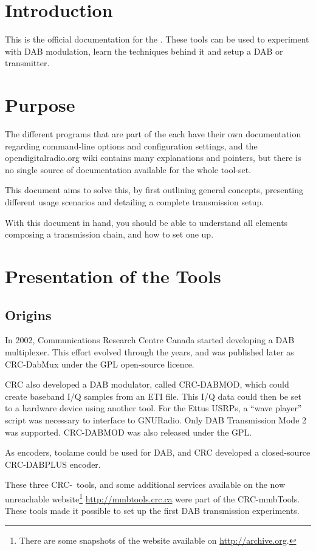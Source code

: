 \section{Introduction}
This is the official documentation for the \mmbtools. These tools can be used to
experiment with DAB modulation, learn the techniques behind it and setup a DAB
or \dabplus transmitter.

\section{Purpose}
The different programs that are part of the \mmbtools each have their own
documentation regarding command-line options and configuration settings, and the
opendigitalradio.org wiki
contains many explanations and pointers, but there is
no single source of documentation available for the whole tool-set.

This document aims to solve this, by first outlining general concepts,
presenting different usage scenarios and detailing a complete transmission
setup.

With this document in hand, you should be able to understand all elements
composing a \mmbtools transmission chain, and how to set one up.

\section{Presentation of the Tools}
\subsection{Origins}
In 2002, Communications Research Centre Canada
started developing a DAB multiplexer. This effort evolved through the years, and
was published later as \mbox{CRC-DabMux} under the GPL
open-source licence.

CRC also developed a DAB modulator, called \mbox{CRC-DABMOD}, which could create
baseband I/Q samples from an ETI file. This I/Q data could then be set to
a hardware device using another tool. For the Ettus USRPs, a ``wave player''
script was necessary to interface to GNURadio. Only DAB Transmission Mode 2 was
supported. \mbox{CRC-DABMOD} was also released under the GPL.

As encoders, toolame could be used for DAB, and CRC developed a closed-source
\mbox{CRC-DABPLUS} \dabplus encoder.

These three CRC-~tools, and some additional services available on the now
unreachable website\footnote{There are some snapshots of the website available
    on \url{http://archive.org}.} \url{http://mmbtools.crc.ca} were
part of the \mbox{CRC-mmbTools}. These tools made it possible to set up the
first DAB transmission experiments.

